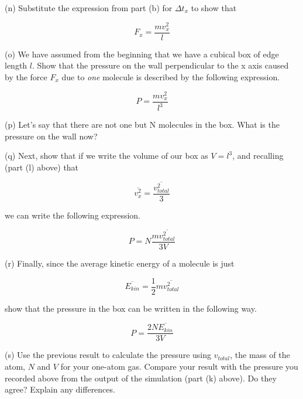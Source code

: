 (n) Substitute the expression from part (b) for \( \Delta t_{x} \)
to show that 

\[
F_{x}=\frac{mv_{x}^{2}}{l}\]

\vspace{20mm}

(o) We have assumed from the beginning that we have a cubical box of edge length $l$. Show
that the pressure on the wall perpendicular to the x axis caused by
the force \( F_{x} \) due to \emph{one} molecule is described by
the following expression.

\[
P=\frac{mv_{x}^{2}}{l^{3}}\]

\vspace{20mm}

(p) Let's say that there are not one but N molecules in the box. What
is the pressure on the wall now?
\vspace{20mm}

(q) Next, show that if we write the volume of our box as \( V=l^{3} \),
and recalling (part (l) above) that

\[
\overline{v_{x}^{2}}=\frac{\overline{v_{total}^{2}}}{3}\]


we can write the following expression.

\[
P=N\frac{m\overline{v_{total}^{2}}}{3V}\]

\vspace{20mm}

\newpage

(r) Finally, since the average kinetic energy of a molecule is just

\[
\overline{E_{kin}}=\frac{1}{2}m\overline{v_{total}^{2}}\]


show that the pressure in the box can be written in the following
way.

\[
P=\frac{2N\overline{E_{kin}}}{3V}\]
\vspace{20mm}

(s) Use the previous result to calculate the pressure using $v_{total}$, the mass of the
atom, $N$ and $V$ for your one-atom gas. Compare your result with the pressure 
you recorded above from the output of the simulation (part (k) above).
Do they agree? Explain any differences.
\vspace{20mm}
